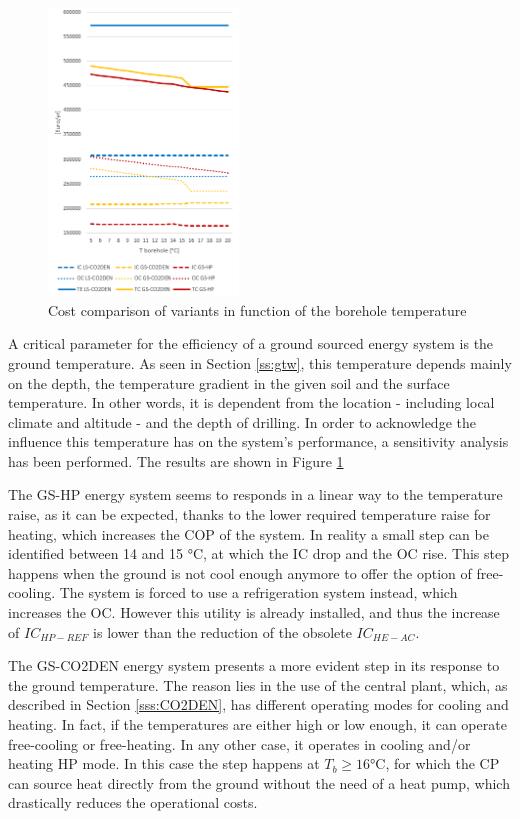 \documentclass{article}
\begin{document}
\begin{figure} 
	\vspace{-20pt}
	\centering
	\includegraphics[width=0.45\textwidth]{V_SA_Tg.png}
	\caption{Cost comparison of variants in function of the borehole temperature}
	\label{fig:V_SA_Tg}
	\vspace{-10pt}
\end{figure}

A critical parameter for the efficiency of a ground sourced energy system is the ground temperature. As seen in Section \ref{ss:gtw}, this temperature depends mainly on the depth, the temperature gradient in the given soil and the surface temperature. In other words, it is dependent from the location - including local climate and altitude - and the depth of drilling. In order to acknowledge the influence this temperature has on the system's performance, a sensitivity analysis has been performed. The results are shown in Figure \ref{fig:V_SA_Tg}

The GS-HP energy system seems to responds in a linear way to the temperature raise, as it can be expected, thanks to the lower required temperature raise for heating, which increases the COP of the system. In reality a small step can be identified between 14 and 15 \si{\celsius}, at which the IC drop and the OC rise. This step happens when the ground is not cool enough anymore to offer the option of free-cooling. The system is forced to use a refrigeration system instead, which increases the OC. However this utility is already installed, and thus the increase of $IC_{HP-REF}$ is lower than the reduction of the obsolete $IC_{HE-AC}$.

The GS-CO2DEN energy system presents a more evident step in its response to the ground temperature. The reason lies in the use of the central plant, which, as described in Section \ref{sss:CO2DEN}, has different operating modes for cooling and heating. In fact, if the temperatures are either high or low enough, it can operate free-cooling or free-heating. In any other case, it operates in cooling and/or heating HP mode. In this case the step happens at $T_{b} \geq 16 \si{\celsius}$, for which the CP can source heat directly from the ground without the need of a heat pump, which drastically reduces the operational costs.
\end{document}

